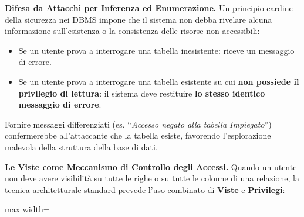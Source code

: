\documentclass[12pt]{extarticle}
\begin{document}
\noindent \textbf{Difesa da Attacchi per Inferenza ed Enumerazione.} Un principio cardine della sicurezza nei DBMS impone che il sistema non debba rivelare alcuna informazione sull'esistenza o la consistenza delle risorse non accessibili:
\begin{itemize}
    \item Se un utente prova a interrogare una tabella inesistente: riceve un messaggio di errore.
    \item Se un utente prova a interrogare una tabella esistente su cui \textbf{non possiede il privilegio di lettura}: il sistema deve restituire \textbf{lo stesso identico messaggio di errore}.
\end{itemize}
Fornire messaggi differenziati (es. ``\textit{Accesso negato alla tabella Impiegato}'') confermerebbe all'attaccante che la tabella esiste, favorendo l'esplorazione malevola della struttura della base di dati.

\medskip
\noindent \textbf{Le Viste come Meccanismo di Controllo degli Accessi.} Quando un utente non deve avere visibilità su tutte le righe o su tutte le colonne di una relazione, la tecnica architetturale standard prevede l'uso combinato di \textbf{Viste} e \textbf{Privilegi}:

\begin{center}
\begin{adjustbox}{max width=\linewidth}
\end{adjustbox}
\end{center}
\end{document}
